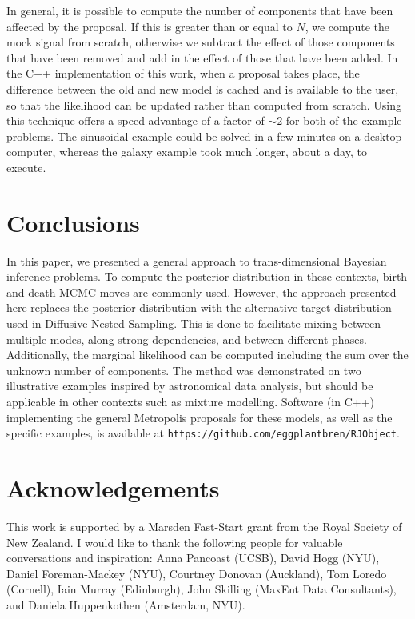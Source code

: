 \documentclass[letterpaper, 11pt]{article}
\begin{document}
In general, it is possible to compute the number of components that have been
affected by the proposal. If this is greater than or equal to $N$, we compute
the mock signal from scratch, otherwise we subtract the effect of those
components that have been removed and add in the effect of those that have been
added. In the C++ implementation of this work, when a proposal takes
place, the difference between the old and new model is cached and is available
to the user, so that the likelihood can be updated rather than computed
from scratch. Using this technique offers a speed advantage of a factor of
$\sim 2$ for both of the example problems. The sinusoidal example could be
solved in a few minutes on a desktop computer, whereas the galaxy example took
much longer, about a day, to execute.

\section{Conclusions}
In this paper, we presented a general approach to trans-dimensional Bayesian
inference problems. To compute the posterior distribution in these contexts,
birth and death MCMC moves are commonly used. However, the approach presented
here replaces the posterior distribution with the alternative target
distribution used in Diffusive Nested Sampling. This is done to facilitate
mixing between multiple modes, along strong dependencies,
and between different phases. Additionally,
the marginal likelihood can be computed including the sum over the unknown
number of components. The method was demonstrated on two illustrative examples
inspired by astronomical data analysis, but should be applicable in other
contexts such as mixture modelling. Software (in C++) implementing the
general Metropolis proposals for these models, as well as the specific
examples, is available at {\tt https://github.com/eggplantbren/RJObject}.

\section*{Acknowledgements}
This work is supported by a Marsden Fast-Start grant
from the Royal Society of New Zealand. I would like to thank the following
people for valuable conversations and inspiration:
Anna Pancoast (UCSB), David Hogg (NYU), Daniel Foreman-Mackey (NYU),
Courtney Donovan (Auckland), Tom Loredo (Cornell), Iain Murray (Edinburgh),
John Skilling (MaxEnt Data Consultants), and Daniela Huppenkothen
(Amsterdam, NYU).
\end{document}
